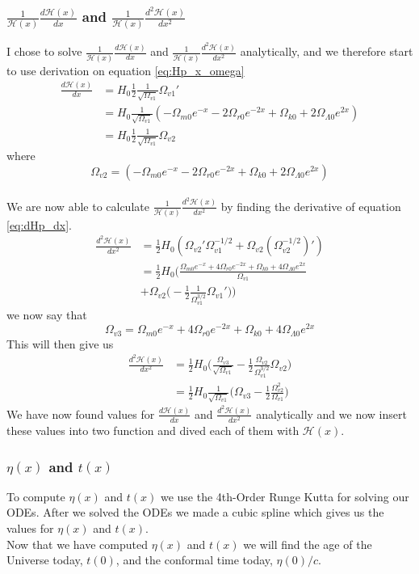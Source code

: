 \documentclass{aa}
\begin{document}
\subsubsection{$\frac{1}{\mathcal{H}(x)}\frac{d\mathcal{H}(x)}{dx}$ and $\frac{1}{\mathcal{H}(x)}\frac{d^2\mathcal{H}(x)}{dx^2}$}
I chose to solve $\frac{1}{\mathcal{H}(x)}\frac{d\mathcal{H}(x)}{dx}$ and $\frac{1}{\mathcal{H}(x)}\frac{d^2\mathcal{H}(x)}{dx^2}$ analytically, and we therefore start to use derivation on equation \eqref{eq:Hp_x_omega}
\begin{align}
    \frac{d\mathcal{H}(x)}{dx}&=H_0\frac{1}{2}\frac{1}{\sqrt{\Omega_{v1}}}\Omega_{v1}'\\
    &=H_0\frac{1}{\sqrt{\Omega_{v1}}}(-\Omega_{m0}e^{-x}-2\Omega_{r0}e^{-2x}+\Omega_{k0}+2\Omega_{\Lambda0}e^{2x})\\
    &=H_0\frac{1}{2}\frac{1}{\sqrt{\Omega_{v1}}}\Omega_{v2} \label{eq:dHp_dx}
\end{align}
where $$\Omega_{v2}=(-\Omega_{m0}e^{-x}-2\Omega_{r0}e^{-2x}+\Omega_{k0}+2\Omega_{\Lambda0}e^{2x})$$\\
We are now able to calculate $\frac{1}{\mathcal{H}(x)}\frac{d^2\mathcal{H}(x)}{dx^2}$ by finding the derivative of equation \eqref{eq:dHp_dx}.
\begin{align}
   \frac{d^2\mathcal{H}(x)}{dx^2}&=\frac{1}{2}H_0(\Omega_{v2}'\Omega_{v1}^{-1/2}+\Omega_{v2}(\Omega_{v2}^{-1/2})' )\\
   &=\frac{1}{2}H_0\bigg(\frac{\Omega_{m0}e^{-x}+4\Omega_{r0}e^{-2x}+\Omega_{k0}+4\Omega_{\Lambda0}e^{2x}}{\Omega_{v1}}\nonumber\\&+\Omega_{v2}\bigg(-\frac{1}{2}\frac{1}{\Omega_{v1}^{3/2}}\Omega_{v1}'\bigg)\bigg)
\end{align}
we now say that $$\Omega_{v3}=\Omega_{m0}e^{-x}+4\Omega_{r0}e^{-2x}+\Omega_{k0}+4\Omega_{\Lambda0}e^{2x}$$ 
This will then give us
\begin{align}
    \frac{d^2\mathcal{H}(x)}{dx^2}&=\frac{1}{2}H_0\bigg(\frac{\Omega_{v3}}{\sqrt{\Omega_{v1}}}-\frac{1}{2}\frac{\Omega_{v2}}{{\Omega_{v1}^{3/2}}}\Omega_{v2}\bigg)\\
    &=\frac{1}{2}H_0\frac{1}{\sqrt{\Omega_{v1}}}\bigg(\Omega_{v3}-\frac{1}{2}\frac{\Omega_{v2}^2}{\Omega_{v1}}\bigg)
\end{align}
We have now found values for $\frac{d\mathcal{H}(x)}{dx}$ and $\frac{d^2\mathcal{H}(x)}{dx^2}$ analytically and we now insert these values into two function and dived each of them with $\mathcal{H}(x)$.\\
\subsubsection{$\eta(x)$ and $t(x)$}
To compute $\eta(x)$ and $t(x)$ we use the 4th-Order Runge Kutta for solving our ODEs. After we solved the ODEs we made a cubic spline which gives us the values for $\eta(x)$ and $t(x)$.\\
Now that we have computed $\eta(x)$ and $t(x)$ we will find the age of the Universe today, $t(0)$, and the conformal time today, $\eta(0)/c$.
\end{document}
